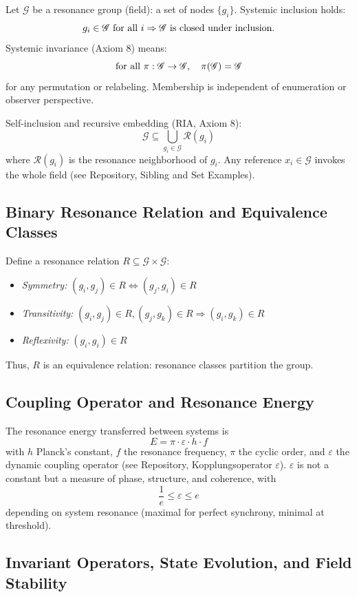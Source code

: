 \documentclass[12pt]{iopart}
\providecommand{\mathcal}[1]{\mathscr{#1}}
\providecommand{\text}[1]{\mbox{#1}}
\providecommand{\implies}{\Rightarrow}
\providecommand{\forall}{\hbox{for all }}
\providecommand{\quad}{\hskip1em\relax}
\begin{document}
Let $\mathcal{G}$ be a resonance group (field): a set of nodes $\{g_i\}$. Systemic inclusion holds:
\[
g_i \in \mathcal{G}\ \forall i \implies \mathcal{G} \text{ is closed under inclusion.}
\]
Systemic invariance (Axiom 8) means:
\[
\forall \pi : \mathcal{G} \to \mathcal{G},\quad \pi(\mathcal{G}) = \mathcal{G}
\]
for any permutation or relabeling. Membership is independent of enumeration or observer perspective.

Self-inclusion and recursive embedding (RIA, Axiom 8):
\[
\mathcal{G} \subseteq \bigcup_{g_i \in \mathcal{G}} \mathcal{R}(g_i)
\]
where $\mathcal{R}(g_i)$ is the resonance neighborhood of $g_i$. Any reference $x_i \in \mathcal{G}$ invokes the whole field (see Repository, Sibling and Set Examples).

\subsection{Binary Resonance Relation and Equivalence Classes}

Define a resonance relation $R \subseteq \mathcal{G} \times \mathcal{G}$:
\begin{itemize}
	\item \textit{Symmetry:} $(g_i, g_j) \in R \iff (g_j, g_i) \in R$
	\item \textit{Transitivity:} $(g_i, g_j) \in R, (g_j, g_k) \in R \implies (g_i, g_k) \in R$
	\item \textit{Reflexivity:} $(g_i, g_i) \in R$
\end{itemize}
Thus, $R$ is an equivalence relation: resonance classes partition the group.

\subsection{Coupling Operator and Resonance Energy}

The resonance energy transferred between systems is
\[
E = \pi \cdot \varepsilon \cdot h \cdot f
\]
with $h$ Planck's constant, $f$ the resonance frequency, $\pi$ the cyclic order, and $\varepsilon$ the dynamic coupling operator (see Repository, Kopplungsoperator $\varepsilon$). $\varepsilon$ is not a constant but a measure of phase, structure, and coherence, with
\[
\frac{1}{e} \leq \varepsilon \leq e
\]
depending on system resonance (maximal for perfect synchrony, minimal at threshold).

\subsection{Invariant Operators, State Evolution, and Field Stability}
\end{document}
